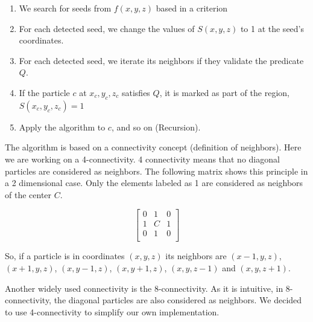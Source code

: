 \documentclass[12pt]{article}
\begin{document}
\begin{enumerate}
	\item We search for seeds from $f(x,y,z)$ based in a criterion
	\item For each detected seed, we change the values of $S(x,y,z)$ to 1 at the seed's coordinates.
	\item For each detected seed, we iterate its neighbors if they validate the predicate $Q$.
    \item If the particle $c$ at $x_c, y_c, z_c$ satisfies $Q$, it is marked as part of the region, $S(x_c, y_c, z_c) = 1$
    \item Apply the algorithm to $c$, and so on
     (Recursion).
\end{enumerate}

\begin{par}
The algorithm is based on a connectivity concept (definition of
neighbors). Here we are working on a 4-connectivity. 4
connectivity means that no diagonal particles are considered as
neighbors. The following matrix shows this principle in a 2
dimensional case. Only the elements labeled as 1 are considered as
neighbors of the center $C$.
\end{par}
\[ 
\begin{bmatrix} 
    0 & 1 & 0 \\
    1 & C & 1 \\
    0 & 1 & 0\\
\end{bmatrix} 
\]

\begin{par}
So, if a particle is in coordinates $(x,y,z)$ its neighbors are
$(x-1,y,z)$, $(x+1,y,z)$, $(x,y-1,z)$, $(x,y+1,z)$, $(x,y,z-1)$
and $(x,y,z+1)$.
\end{par}

\begin{par}
Another widely used connectivity is the 8-connectivity. As it is
intuitive, in 8-connectivity, the diagonal particles are also
considered as neighbors. We decided to use 4-connectivity to
simplify our own implementation.
\end{par}
\end{document}
